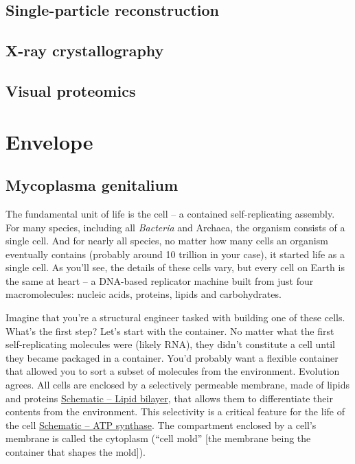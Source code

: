 \documentclass[]{tufte-book}
\begin{document}
\section{Single-particle
reconstruction}\label{single-particle-reconstruction}

\section{X-ray crystallography}\label{x-ray-crystallography}

\section{Visual proteomics}\label{visual-proteomics}

\chapter{Envelope}\label{envelope}

\section{Mycoplasma genitalium}\label{mycoplasma-genitalium}

The fundamental unit of life is the cell -- a contained self-replicating
assembly. For many species, including all \emph{Bacteria} and Archaea,
the organism consists of a single cell. And for nearly all species, no
matter how many cells an organism eventually contains (probably around
10 trillion in your case), it started life as a single cell. As you'll
see, the details of these cells vary, but every cell on Earth is the
same at heart -- a DNA-based replicator machine built from just four
macromolecules: nucleic acids, proteins, lipids and carbohydrates.

Imagine that you're a structural engineer tasked with building one of
these cells. What's the first step? Let's start with the container. No
matter what the first self-replicating molecules were (likely RNA), they
didn't constitute a cell until they became packaged in a container.
You'd probably want a flexible container that allowed you to sort a
subset of molecules from the environment. Evolution agrees. All cells
are enclosed by a selectively permeable membrane, made of lipids and
proteins \protect\hyperlink{Lipid_bilayer}{Schematic -- Lipid bilayer},
that allows them to differentiate their contents from the environment.
This selectivity is a critical feature for the life of the cell
\protect\hyperlink{ATP_synthase_and_energy_production}{Schematic -- ATP
synthase}. The compartment enclosed by a cell's membrane is called the
cytoplasm (``cell mold'' {[}the membrane being the container that shapes
the mold{]}).
\end{document}
